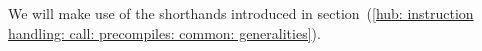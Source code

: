 We will make use of the shorthands introduced in section~(\ref{hub: instruction handling: call: precompiles: common: generalities}).
